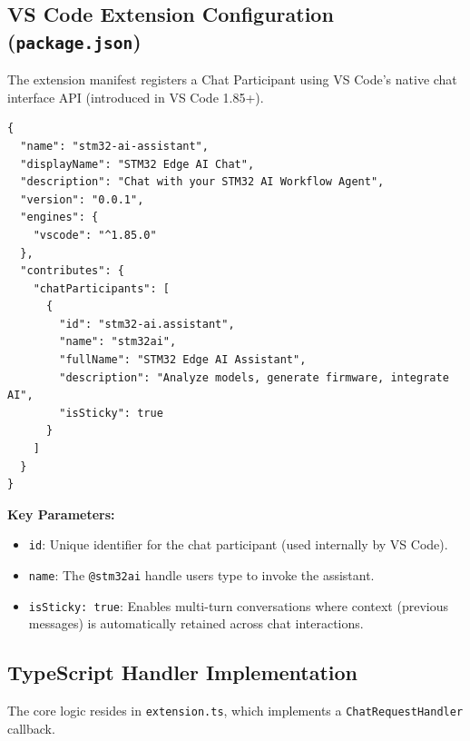 \subsection{VS Code Extension Configuration (\texttt{package.json})}

The extension manifest registers a Chat Participant using VS Code's native chat interface API (introduced in VS Code 1.85+).

\begin{lstlisting}[caption={Chat Participant registration in package.json}, label={lst:package_json}]
{
  "name": "stm32-ai-assistant",
  "displayName": "STM32 Edge AI Chat",
  "description": "Chat with your STM32 AI Workflow Agent",
  "version": "0.0.1",
  "engines": {
    "vscode": "^1.85.0"
  },
  "contributes": {
    "chatParticipants": [
      {
        "id": "stm32-ai.assistant",
        "name": "stm32ai",
        "fullName": "STM32 Edge AI Assistant",
        "description": "Analyze models, generate firmware, integrate AI",
        "isSticky": true
      }
    ]
  }
}
\end{lstlisting}

\textbf{Key Parameters:}
\begin{itemize}
  \item \texttt{id}: Unique identifier for the chat participant (used internally by VS Code).
  \item \texttt{name}: The \texttt{@stm32ai} handle users type to invoke the assistant.
  \item \texttt{isSticky: true}: Enables multi-turn conversations where context (previous messages) is automatically retained across chat interactions.
\end{itemize}

\subsection{TypeScript Handler Implementation}

The core logic resides in \texttt{extension.ts}, which implements a \texttt{ChatRequestHandler} callback.

